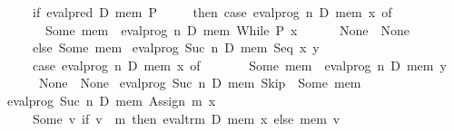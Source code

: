 \begin{isabellebody}
\ \ \ \ \ {}if\ eval{}pred\ D\ mem\ P\isanewline
\ \ \ \ \ then\ case\ eval{}prog\ n\ D\ mem\ x\ of\isanewline
\ \ \ \ \ \ \ Some\ mem{}\ {}\ eval{}prog\ n\ D\ mem{}\ {}While\ P\ x{}\isanewline
\ \ \ \ \ {}\ None\ {}\ None\isanewline
\ \ \ \ \ else\ Some\ mem{}{}\isanewline
{}\ {}eval{}prog\ {}Suc\ n{}\ D\ mem\ {}Seq\ x\ y{}\ {}\isanewline
\ \ \ \ \ {}case\ eval{}prog\ n\ D\ mem\ x\ of\isanewline
\ \ \ \ \ \ \ Some\ mem{}\ {}\ eval{}prog\ n\ D\ mem{}\ y\isanewline
\ \ \ \ \ {}\ None\ {}\ None{}{}\isanewline
{}\ {}eval{}prog\ {}Suc\ n{}\ D\ mem\ Skip\ {}\ Some\ mem{}\isanewline
{}\ {}eval{}prog\ {}Suc\ n{}\ D\ mem\ {}Assign\ m\ x{}\ {}\isanewline
\ \ \ \ \ {}Some\ {}{}v{}\ if\ v\ {}\ m\ then\ eval{}trm\ D\ mem\ x\ else\ mem\ v{}{}{}\isanewline

\end{isabellebody}
